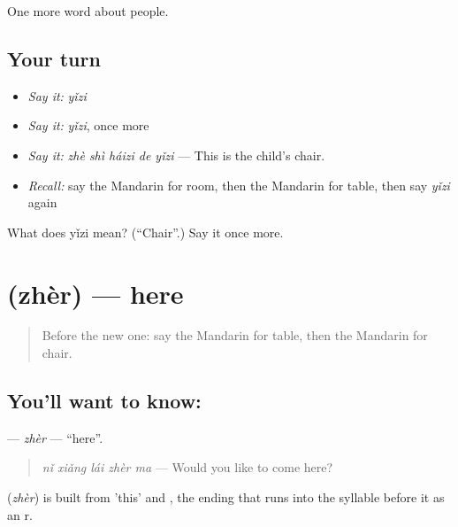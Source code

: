 \begin{grammarlens}[title={What you've built}]
One more word about people.
\end{grammarlens}

\subsection*{Your turn}
\begin{itemize}
\raggedright
  \item \emph{Say it:} \emph{yǐzi}
  \item \emph{Say it:} \emph{yǐzi}, once more
  \item \emph{Say it:} \emph{zhè shì háizi de yǐzi} — This is the child's chair.
  \item \emph{Recall:} say the Mandarin for room, then the Mandarin for table, then say \emph{yǐzi} again
\end{itemize}

\begin{tcolorbox}[breakable,colback=teal!4,colframe=teal!35!black,title={Before you move on}]
What does yǐzi mean? (\textquotedblleft{}Chair\textquotedblright{}.) Say it once more.
\end{tcolorbox}
\section[\texorpdfstring{\zh{这儿} (zhèr)}{这儿 (zhèr)}]{ (zhèr) — here}

\label{lesson:ZH-C57-zher}



\begin{quote}
Before the new one: say the Mandarin for table, then the Mandarin for chair.
\end{quote}

\subsection*{You'll want to know: }
\textbf{} — \emph{zhèr} — \textquotedblleft{}here\textquotedblright{}.

\begin{quote}
\textbf{} \emph{nǐ xiǎng lái zhèr ma} — Would you like to come here?
\end{quote}

\begin{cousinweb}
\textbf{} (\emph{zhèr}) is built from  'this' and , the ending that runs into the syllable before it as an r.
\end{cousinweb}

